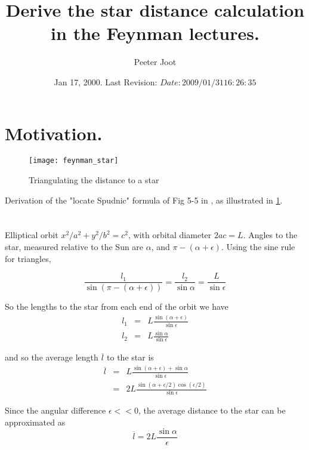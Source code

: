 \documentclass{article}
\title{ Derive the star distance calculation in the Feynman lectures. }
\author{Peeter Joot}
\date{ Jan 17, 2000.  Last Revision: $Date: 2009/01/31 16:26:35 $ }
\begin{document}
\maketitle{}

\section{ Motivation. }

\begin{figure}[htp]
\centering
\texttt{[image: feynman\_star]}
\caption{Triangulating the distance to a star}\label{fig:feynman_star}
\end{figure}

Derivation of the "locate Spudnic" formula of Fig 5-5 in 
\cite{feynman1963flp}, as illustrated in \ref{fig:feynman_star}.

\section{}

Elliptical orbit $x^2/a^2 + y^2/b^2 = c^2$, with orbital diameter $2ac = L$.
Angles to the star, measured relative to the Sun are $\alpha$, and 
$\pi - (\alpha+\epsilon)$.  Using the sine rule for triangles, 

\begin{displaymath}
  \frac{ l_1}{\sin(\pi - (\alpha + \epsilon))} 
= \frac{ l_2 }{\sin{\alpha}}
= \frac{L}{\sin{\epsilon}}
\end{displaymath}

So the lengths to the star from each end of the orbit we have 
\begin{eqnarray*}
l_1 & = & L \frac{ \sin(\alpha + \epsilon) }   { \sin{\epsilon}} \\
l_2 & = & L \frac{ \sin{\alpha} }   { \sin{\epsilon}}
\end{eqnarray*}

and so the average length $\overline{l}$ to the star is 
\begin{eqnarray*}
\overline{l} & = & L \frac{ \sin(\alpha + \epsilon) + \sin{\alpha} }{    \sin{\epsilon}} \\
             & = & 2L \frac{ \sin(\alpha + \epsilon/2)\cos(\epsilon/2) }{    \sin{\epsilon}}
\end{eqnarray*}

Since the angular difference $\epsilon << 0$, the average distance to the star can be approximated as
\begin{displaymath}
\overline{l} = 2L \frac{ \sin{\alpha} }{\epsilon }
\end{displaymath}




\end{document}
